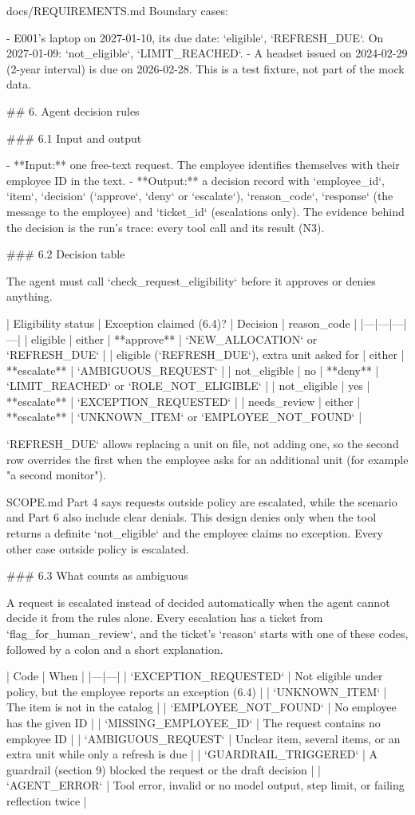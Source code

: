\documentclass[11pt,letterpaper]{article}
\renewcommand{\_}{\textunderscore\allowbreak}
\begin{document}
\begin{appendixpromptbox}{docs/REQUIREMENTS.md}
Boundary cases:

- E001's laptop on 2027-01-10, its due date: `eligible`, `REFRESH_DUE`. On 2027-01-09:
  `not_eligible`, `LIMIT_REACHED`.
- A headset issued on 2024-02-29 (2-year interval) is due on 2026-02-28. This is a test fixture,
  not part of the mock data.

## 6. Agent decision rules

### 6.1 Input and output

- **Input:** one free-text request. The employee identifies themselves with their employee ID in
  the text.
- **Output:** a decision record with `employee_id`, `item`, `decision` (`approve`, `deny` or
  `escalate`), `reason_code`, `response` (the message to the employee) and `ticket_id`
  (escalations only). The evidence behind the decision is the run's trace: every tool call and its
  result (N3).

### 6.2 Decision table

The agent must call `check_request_eligibility` before it approves or denies anything.

| Eligibility status | Exception claimed (6.4)? | Decision | reason_code |
|---|---|---|---|
| eligible | either | **approve** | `NEW_ALLOCATION` or `REFRESH_DUE` |
| eligible (`REFRESH_DUE`), extra unit asked for | either | **escalate** | `AMBIGUOUS_REQUEST` |
| not_eligible | no | **deny** | `LIMIT_REACHED` or `ROLE_NOT_ELIGIBLE` |
| not_eligible | yes | **escalate** | `EXCEPTION_REQUESTED` |
| needs_review | either | **escalate** | `UNKNOWN_ITEM` or `EMPLOYEE_NOT_FOUND` |

`REFRESH_DUE` allows replacing a unit on file, not adding one, so the second row overrides the
first when the employee asks for an additional unit (for example "a second monitor").

SCOPE.md Part 4 says requests outside policy are escalated, while the scenario and Part 6 also
include clear denials. This design denies only when the tool returns a definite `not_eligible`
and the employee claims no exception. Every other case outside policy is escalated.

### 6.3 What counts as ambiguous

A request is escalated instead of decided automatically when the agent cannot decide it from the
rules alone. Every escalation has a ticket from `flag_for_human_review`, and the ticket's `reason`
starts with one of these codes, followed by a colon and a short explanation.

| Code | When |
|---|---|
| `EXCEPTION_REQUESTED` | Not eligible under policy, but the employee reports an exception (6.4) |
| `UNKNOWN_ITEM` | The item is not in the catalog |
| `EMPLOYEE_NOT_FOUND` | No employee has the given ID |
| `MISSING_EMPLOYEE_ID` | The request contains no employee ID |
| `AMBIGUOUS_REQUEST` | Unclear item, several items, or an extra unit while only a refresh is due |
| `GUARDRAIL_TRIGGERED` | A guardrail (section 9) blocked the request or the draft decision |
| `AGENT_ERROR` | Tool error, invalid or no model output, step limit, or failing reflection twice |


\end{appendixpromptbox}
\end{document}
